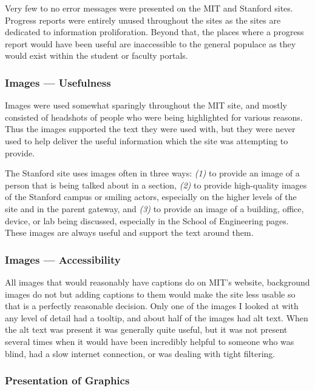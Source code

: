 Very few to no error messages were presented on the MIT and Stanford sites.
Progress reports were entirely unused throughout the sites as the sites are dedicated to
information proliforation. Beyond that, the places where a progress report would have been
useful are inaccessible to the general populace as they would exist within the student or
faculty portals.

\subsubsection*{Images --- Usefulness}

Images were used somewhat sparingly throughout the MIT site, and mostly consisted of headshots of people who were
being highlighted for various reasons. Thus the images supported the text they were used
with, but they were never used to help deliver the useful information which the site
was attempting to provide.

The Stanford site uses images often in three ways: \textit{(1)} to provide an image
of a person that is being talked about in a section, \textit{(2)} to provide high-quality
images of the Stanford campus or smiling actors, especially on the higher levels of
the site and in the parent gateway, and \textit{(3)} to provide an image of a building,
office, device, or lab being discussed, especially in the School of Engineering
pages. These images are always useful and support the text around them.

\subsubsection*{Images --- Accessibility}

All images that would reasonably have captions do on MIT's website, background images do not but
adding captions to them would make the site less usable so that is a perfectly reasonable
decision. Only one of the images I looked at with any level of detail had a tooltip, and
about half of the images had alt text. When the alt text was present it was generally quite
useful, but it was not present several times when it would have been incredibly helpful to
someone who was blind, had a slow internet connection, or was dealing with tight filtering.

\subsubsection*{Presentation of Graphics}

